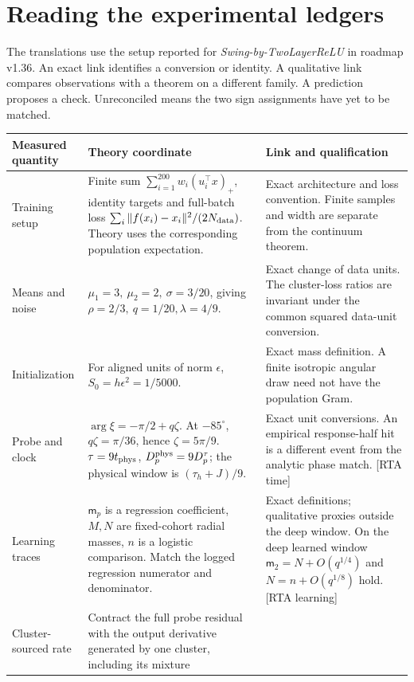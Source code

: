 \documentclass[10pt,twocolumn]{article}
\newcommand{\src}[1]{\textnormal{\small [#1]}}
\begin{document}
\section{Reading the experimental ledgers}\label{p1thv1:translation}
The translations use the setup reported for \emph{Swing-by-TwoLayerReLU}
in roadmap v1.36. An exact link identifies a conversion or identity.
A qualitative link compares observations with a theorem on a different
family. A prediction proposes a check. Unreconciled means the two sign
assignments have yet to be matched.
\small\begin{longtable}{@{}>{\raggedright\arraybackslash}p{}
 >{\raggedright\arraybackslash}p{}
 >{\raggedright\arraybackslash}p{}@{}}
\toprule Measured quantity & Theory coordinate & Link and qualification\\\midrule\endhead
Training setup & Finite sum \(\sum_{i=1}^{200}w_i(u_i^\top x)_+\),
identity targets and full-batch loss \(\sum_i\|f(x_i)-x_i\|^2/(2N_{\rm data})\).
Theory uses the corresponding population expectation. &
Exact architecture and loss convention. Finite samples and width
are separate from the continuum theorem.\\
Means and noise & \(\mu_1=3,\ \mu_2=2,\ \sigma=3/20\), giving
\(\rho=2/3,\ q=1/20,\lambda=4/9\). &
Exact change of data units. The cluster-loss ratios are invariant
under the common squared data-unit conversion.\\
Initialization & For aligned units of norm \(\epsilon\),
\(S_0=h\epsilon^2=1/5000\). &
Exact mass definition. A finite isotropic angular draw need not have
the population Gram.\\
Probe and clock & \(\arg\xi=-\pi/2+q\zeta\).
At \(-85^\circ\), \(q\zeta=\pi/36\), hence \(\zeta=5\pi/9\).
\(\tau=9t_{\rm phys}\), \(D_p^{\rm phys}=9D_p^\tau\);
the physical window is \((\tau_h+J)/9\). &
Exact unit conversions. An empirical response-half hit is a different
event from the analytic phase match. \src{RTA time}\\
Learning traces & \(\mathsf m_p\) is a regression coefficient,
\(M,N\) are fixed-cohort radial masses, \(n\) is a logistic comparison.
Match the logged regression numerator and denominator. &
Exact definitions; qualitative proxies outside the deep window.
On the deep learned window \(\mathsf m_2=N+O(q^{1/4})\) and \(N=n+O(q^{1/8})\) hold. \src{RTA learning}\\
Cluster-sourced rate & Contract the full probe residual with the
output derivative generated by one cluster, including its mixture

\end{longtable}
\end{document}
